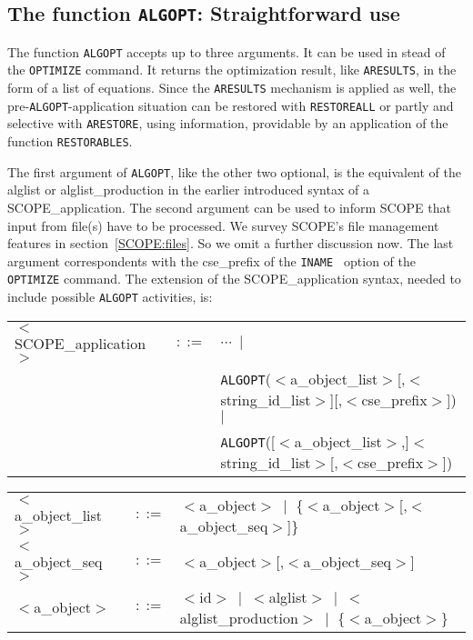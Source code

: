 \subsection{The function {\tt ALGOPT}: Straightforward use}\label{SCOPE:algo}

The function {\tt ALGOPT} accepts up to three arguments. It can be used in 
stead of the {\tt OPTIMIZE} command. It returns the optimization result,
like {\tt ARESULTS}, in the form of a list of equations. 
Since the {\tt ARESULTS} mechanism
is applied as well, the pre-{\tt ALGOPT}-application situation can be restored
with {\tt RESTOREALL} or partly and selective with {\tt ARESTORE}, using
information, providable by an application of the function {\tt RESTORABLES}.

The first argument of {\tt ALGOPT}, like the other two optional, is the 
equivalent of the alglist or alglist\_production in the earlier introduced
syntax of a SCOPE\_application.
The second argument can be used to inform SCOPE
that input from file(s) have to be processed. We survey SCOPE's file 
management features in section~\ref{SCOPE:files}. So we omit a further 
discussion now. The last argument correspondents with the cse\_prefix 
of the {\tt INAME } option of the {\tt OPTIMIZE} command. The extension
of the SCOPE\_application syntax, needed to include possible {\tt ALGOPT} 
activities, is:

\begin{tabular}{lcl}
$<$SCOPE\_application$>$ & $::=$ & $\cdots~\mid~$\\
 & & {\tt ALGOPT}($<$a\_object\_list$>$[,$<$string\_id\_list$>$][,$<$cse\_prefix$>$]) $\mid$\\
 & & {\tt ALGOPT}([$<$a\_object\_list$>$,]$<$string\_id\_list$>$[,$<$cse\_prefix$>$])\\
\end{tabular}
\begin{tabular}{lcl}
$<$a\_object\_list$>$ & $::=$ & $<$a\_object$>~\mid$ \{$<$a\_object$>$[,$<$a\_object\_seq$>$]\}\\
$<$a\_object\_seq$>$ & $::=$ & $<$a\_object$>$[,$<$a\_object\_seq$>$]\\
$<$a\_object$>$ & $::=$ & $<$id$>~\mid~<$alglist$>~\mid~<$alglist\_production$>~\mid$
 \{$<$a\_object$>$\}
\end{tabular}

